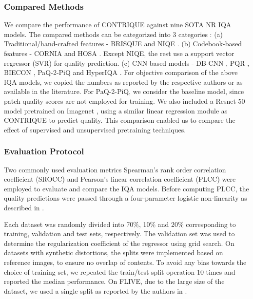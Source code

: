 \documentclass[journal]{IEEEtran}
\begin{document}
\subsubsection*{\textbf{Compared Methods}}
We compare the performance of CONTRIQUE against nine SOTA NR IQA models. The compared methods can be categorized into 3 categories : (a) Traditional/hand-crafted features - BRISQUE \cite{mittal2012no} and NIQE \cite{mittal2013making}. (b) Codebook-based features - CORNIA \cite{ye2012unsupervised} and HOSA \cite{xu2016blind}. Except NIQE, the rest use a support vector regressor (SVR) for quality prediction. (c) CNN based models - DB-CNN \cite{zhang2018blind}, PQR \cite{zeng2017probabilistic}, BIECON \cite{kim2016fully}, PaQ-2-PiQ \cite{ying2019patches} and HyperIQA \cite{su2020blindly}. For objective comparison of the above IQA models, we copied the numbers as reported by the respective authors or as available in the literature. For PaQ-2-PiQ, we consider the baseline model, since patch quality scores are not employed for training. We also included a Resnet-50 \cite{he2016deep} model pretrained on Imagenet \cite{russakovsky2015imagenet}, using a similar linear regression module as CONTRIQUE to predict quality. This comparison enabled us to compare the effect of supervised and unsupervised pretraining techniques. 

\subsubsection*{\textbf{Evaluation Protocol}}
Two commonly used evaluation metrics Spearman's rank order correlation coefficient (SROCC) and Pearson's linear correlation coefficient (PLCC) were employed to evaluate and compare the IQA models. Before computing PLCC, the quality predictions were passed through a four-parameter logistic non-linearity as described in \cite{VQEG2000}.

Each dataset was randomly divided into 70\%, 10\% and 20\% corresponding to training, validation and test sets, respectively. The validation set was used to determine the regularization coefficient of the regressor  using grid search. On datasets with synthetic distortions, the splits were implemented based on reference images, to ensure no overlap of contents. To avoid any bias towards the choice of training set, we repeated the train/test split operation 10 times and reported the median performance. On FLIVE, due to the large size of the dataset, we used a single split as reported by the authors in \cite{ying2019patches}.
\end{document}
